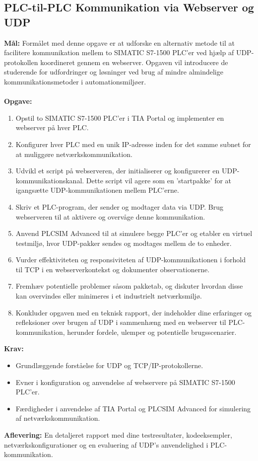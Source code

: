 \subsection*{PLC-til-PLC Kommunikation via Webserver og UDP}
\label{subsec:plc_to_plc_comm_udp}

\textbf{Mål:} Formålet med denne opgave er at udforske en alternativ metode til at facilitere kommunikation mellem to SIMATIC S7-1500 PLC'er ved hjælp af UDP-protokollen koordineret gennem en webserver. Opgaven vil introducere de studerende for udfordringer og løsninger ved brug af mindre almindelige kommunikationsmetoder i automationsmiljøer.
\\\\
\noindent\textbf{Opgave:}
\begin{enumerate}
	\item Opstil to SIMATIC S7-1500 PLC'er i TIA Portal og implementer en webserver på hver PLC.
	\item Konfigurer hver PLC med en unik IP-adresse inden for det samme subnet for at muliggøre netværkskommunikation.
	\item Udvikl et script på webserveren, der initialiserer og konfigurerer en UDP-kommunikationskanal. Dette script vil agere som en 'startpakke' for at igangsætte UDP-kommunikationen mellem PLC'erne.
	\item Skriv et PLC-program, der sender og modtager data via UDP. Brug webserveren til at aktivere og overvåge denne kommunikation.
	\item Anvend PLCSIM Advanced til at simulere begge PLC'er og etabler en virtuel testmiljø, hvor UDP-pakker sendes og modtages mellem de to enheder.
	\item Vurder effektiviteten og responsiviteten af UDP-kommunikationen i forhold til TCP i en webserverkontekst og dokumenter observationerne.
	\item Fremhæv potentielle problemer såsom pakketab, og diskuter hvordan disse kan overvindes eller minimeres i et industrielt netværksmiljø.
	\item Konkluder opgaven med en teknisk rapport, der indeholder dine erfaringer og refleksioner over brugen af UDP i sammenhæng med en webserver til PLC-kommunikation, herunder fordele, ulemper og potentielle brugsscenarier.
\end{enumerate}

\noindent\textbf{Krav:}
\begin{itemize}
	\item Grundlæggende forståelse for UDP og TCP/IP-protokollerne.
	\item Evner i konfiguration og anvendelse af webservere på SIMATIC S7-1500 PLC'er.
	\item Færdigheder i anvendelse af TIA Portal og PLCSIM Advanced for simulering af netværkskommunikation.
\end{itemize}
\textbf{Aflevering:} En detaljeret rapport med dine testresultater, kodeeksempler, netværkskonfigurationer og en evaluering af UDP's anvendelighed i PLC-kommunikation.

